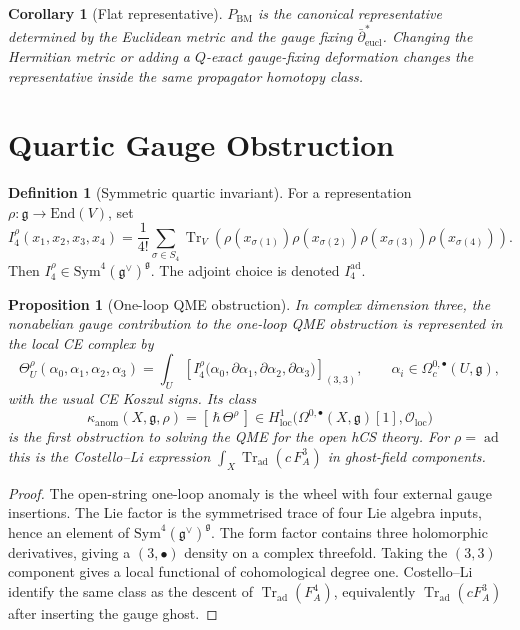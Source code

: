 \documentclass[11pt]{amsart}
\providecommand{\dbarstar}{\bar{\partial}^{\ast}}
\providecommand{\gfrak}{\mathfrak{g}}
\providecommand{\Sym}{\mathrm{Sym}}
\providecommand{\End}{\mathrm{End}}
\providecommand{\Tr}{\operatorname{Tr}}
\providecommand{\ad}{\operatorname{ad}}
\providecommand{\cO}{\mathcal{O}}
\providecommand{\kanom}{\kappa_{\mathrm{anom}}}
\theoremstyle{plain}
\newtheorem{proposition}[theorem]{Proposition}
\newtheorem{corollary}[theorem]{Corollary}
\theoremstyle{definition}
\newtheorem{definition}[theorem]{Definition}
\theoremstyle{remark}
\begin{document}
\begin{corollary}[Flat representative]
\label{cor:flat-representative}
$P_{\mathrm{BM}}$ is the canonical representative determined by the
Euclidean metric and the gauge fixing $\dbarstar_{\mathrm{eucl}}$.
Changing the Hermitian metric or adding a $Q$-exact gauge-fixing
deformation changes the representative inside the same propagator
homotopy class.
\end{corollary}

\section{Quartic Gauge Obstruction}
\label{sec:quartic-obstruction}

\begin{definition}[Symmetric quartic invariant]
\label{def:quartic-invariant}
For a representation $\rho:\gfrak\to\End(V)$, set
\[
  I_4^\rho(x_1,x_2,x_3,x_4)
  =
  \frac1{4!}\sum_{\sigma\in S_4}
  \Tr_V\!\left(
    \rho(x_{\sigma(1)})\rho(x_{\sigma(2)})
    \rho(x_{\sigma(3)})\rho(x_{\sigma(4)})
  \right).
\]
Then $I_4^\rho\in\Sym^4(\gfrak^\vee)^{\gfrak}$. The adjoint choice is
denoted $I_4^{\ad}$.
\end{definition}

\begin{proposition}[One-loop QME obstruction]
\label{prop:qme-obstruction}
In complex dimension three, the nonabelian gauge contribution to the
one-loop QME obstruction is represented in the local CE complex by
\[
  \Theta^\rho_U(\alpha_0,\alpha_1,\alpha_2,\alpha_3)
  =
  \int_U
  \left[
  I_4^\rho\bigl(
  \alpha_0,\partial\alpha_1,\partial\alpha_2,\partial\alpha_3
  \bigr)
  \right]_{(3,3)},
  \qquad
  \alpha_i\in\Omega_c^{0,\bullet}(U,\gfrak),
\]
with the usual CE Koszul signs. Its class
\[
  \kanom(X,\gfrak,\rho)
  =
  [\,\hbar\,\Theta^\rho\,]
  \in H^1_{\mathrm{loc}}
  \bigl(\Omega^{0,\bullet}(X,\gfrak)[1],\cO_{\mathrm{loc}}\bigr)
\]
is the first obstruction to solving the QME for the open hCS theory.
For $\rho=\ad$ this is the Costello--Li expression
$\int_X \Tr_{\ad}(c\,F_A^3)$ in ghost-field components.
\end{proposition}

\begin{proof}
The open-string one-loop anomaly is the wheel with four external gauge
insertions. The Lie factor is the symmetrised trace of four Lie algebra
inputs, hence an element of $\Sym^4(\gfrak^\vee)^{\gfrak}$. The form
factor contains three holomorphic derivatives, giving a $(3,\bullet)$
density on a complex threefold. Taking the $(3,3)$ component gives a
local functional of cohomological degree one. Costello--Li identify the
same class as the descent of $\Tr_{\ad}(F_A^4)$, equivalently
$\Tr_{\ad}(cF_A^3)$ after inserting the gauge ghost.
\end{proof}
\end{document}
